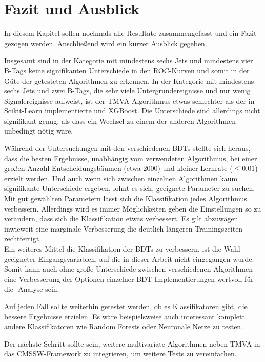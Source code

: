 
\chapter{Fazit und Ausblick}
\label{ch:Fazit}

{}

In diesem Kapitel sollen nochmals alle Resultate zusammengefasst und ein Fazit gezogen werden. Anschlie\ss end wird ein kurzer Ausblick gegeben.

Insgesamt sind in der Kategorie mit mindestens sechs Jets und mindestens vier B-Tags keine signifikanten Unterschiede in den ROC-Kurven und somit in der G\"ute der getesteten Algorithmen zu erkennen. In der Kategorie mit mindestens sechs Jets und zwei B-Tags, die sehr viele Untergrundereignisse und nur wenig Signalereignisse aufweist, ist der TMVA-Algorithmus etwas schlechter als der in Scikit-Learn implementierte und XGBoost. Die Unterschiede sind allerdings nicht signifikant genug, als dass ein Wechsel zu einem der anderen Algorithmen unbedingt n\"otig w\"are.

W\"ahrend der Untersuchungen mit den verschiedenen BDTs stellte sich heraus, dass die besten Ergebnisse, unabh\"angig vom verwendeten Algorithmus, bei einer gro\ss en Anzahl Entscheidungsb\"aumen (etwa 2000) und kleiner Lernrate ($\leq \num{0,01}$) erzielt werden. Und auch wenn sich zwischen einzelnen Algorithmen kaum signifikante Unterschiede ergeben, lohnt es sich, geeignete Parameter zu suchen. Mit gut gew\"ahlten Parametern l\"asst sich die Klassifikation jedes Algorithmus verbessern. Allerdings wird es immer M\"oglichkeiten geben die Einstellungen so zu ver\"andern, dass sich die Klassifikation etwas verbessert. Es gilt abzuw\"agen inwieweit eine marginale Verbesserung die deutlich l\"angeren Trainingszeiten rechtfertigt.\\
Ein weiteres Mittel die Klassifikation der BDTs zu verbessern, ist die Wahl geeigneter Eingangsvariablen, auf die in dieser Arbeit nicht eingegangen wurde. Somit kann auch ohne gro\ss e Unterschiede zwischen verschiedenen Algorithmen eine Verbesserung der Optionen einzelner BDT-Implementierungen wertvoll f\"ur die \ttH-Analyse sein.

Auf jeden Fall sollte weiterhin getestet werden, ob es Klassifikatoren gibt, die bessere Ergebnisse erzielen. Es w\"are beispielsweise auch interessant komplett andere Klassifikatoren wie Random Forests oder Neuronale Netze zu testen.

Der n\"achste Schritt sollte sein, weitere multivariate Algorithmen neben TMVA in das CMSSW-Framework zu integrieren, um weitere Tests zu vereinfachen.